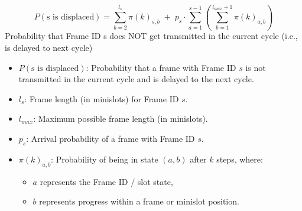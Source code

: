 \[
P(\text{s is displaced}) =
\sum_{b=2}^{l_s} \pi(k)_{s,b}
\;+\;
p_s \cdot \sum_{a=1}^{s-1}
\left(
\sum_{b=1}^{l_{max}+1} \pi(k)_{a,b}
\right)
\]
Probability that Frame ID s does NOT get transmitted in the current cycle (i.e., is delayed to next cycle)
\begin{itemize}
    \item $P(\text{s is displaced})$: Probability that a frame with Frame ID $s$ is not transmitted in the current cycle and is delayed to the next cycle.
    
    \item $l_s$: Frame length (in minislots) for Frame ID $s$.
    
    \item $l_{max}$: Maximum possible frame length (in minislots).
    
    \item $p_s$: Arrival probability of a frame with Frame ID $s$.
    
    \item $\pi(k)_{a,b}$: Probability of being in state $(a,b)$ after $k$ steps, where:
    \begin{itemize}
        \item $a$ represents the Frame ID / slot state,
        \item $b$ represents progress within a frame or minislot position.
    \end{itemize}
\end{itemize}